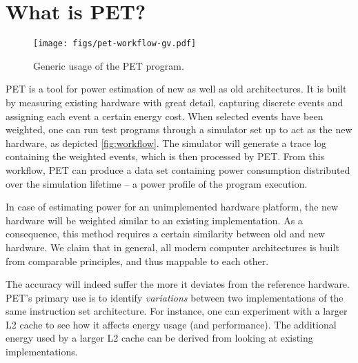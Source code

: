 \section{What is PET?}
\label{sec:whatispet}
\begin{figure}
    \texttt{[image: figs/pet-workflow-gv.pdf]}
    \caption{Generic usage of the PET program.}
    \label{fig:workflow}
\end{figure}

PET is a tool for power estimation of new as well as old architectures. It is
built by measuring existing hardware with great detail, capturing discrete events
and assigning each event a certain energy cost. When selected events have been
weighted, one can run test programs through a simulator set up to act as the
new hardware, as depicted \autoref{fig:workflow}. The simulator will generate a
trace log containing the weighted events, which is then processed by PET.
From this workflow, PET can produce a data set containing power consumption
distributed over the simulation lifetime -- a power profile of the program
execution.

In case of estimating power for an unimplemented hardware platform, the new
hardware will be weighted similar to an existing implementation. As a
consequence, this method requires a certain similarity between old and new
hardware. We claim that in general, all modern computer architectures is built
from comparable principles, and thus mappable to each other.

The accuracy will indeed suffer the more it deviates from the reference
hardware. PET's primary use is to identify \emph{variations} between two
implementations of the same instruction set architecture. For instance, one can
experiment with a larger L2 cache to see how it affects energy usage (and
performance). The additional energy used by a larger L2 cache can be derived
from looking at existing implementations.

